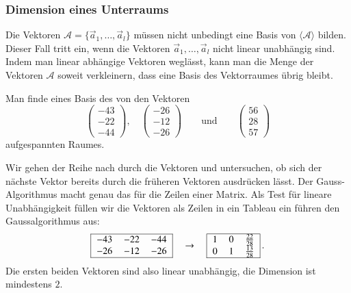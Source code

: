 \subsubsection{Dimension eines Unterraums}
Die Vektoren $\mathcal{A}=\{\vec{a}_1,\dots,\vec{a}_l\}$ müssen nicht
unbedingt eine Basis von $\langle\mathcal{A}\rangle$ bilden.
Dieser Fall tritt ein, wenn die Vektoren $\vec{a}_1,\dots,\vec{a}_l$
nicht linear unabhängig sind.
Indem man linear abhängige Vektoren weglässt, kann man die Menge der
Vektoren $\mathcal{A}$ soweit verkleinern, dass eine Basis des 
Vektorraumes übrig bleibt.

\begin{beispiel}
Man finde eines Basis des von den Vektoren 
\[
\begin{pmatrix}
  -43\\  -22\\  -44
\end{pmatrix},\quad
\begin{pmatrix}
  -26\\  -12\\  -26
\end{pmatrix}
\qquad\text{und}\qquad
\begin{pmatrix}
   56\\   28\\   57
\end{pmatrix}
\]
aufgespannten Raumes.

\smallskip

{\parindent=0pt Wir} gehen der Reihe nach durch die Vektoren und untersuchen,
ob sich der nächste Vektor bereits durch die früheren Vektoren 
ausdrücken lässt.
Der Gauss-Algorithmus macht genau das für die Zeilen einer Matrix.
Als Test für lineare Unabhängigkeit
füllen wir die Vektoren als Zeilen in ein Tableau ein führen
den Gaussalgorithmus aus:
\[
\begin{tabular}{|>{$}c<{$}>{$}c<{$}>{$}c<{$}|}
\hline
  -43&  -22&  -44\\
  -26&  -12&  -26\\
\hline
\end{tabular}
\quad\rightarrow\quad
\begin{tabular}{|>{$}c<{$}>{$}c<{$}>{$}c<{$}|}
\hline
1&0&\frac{22}{28}\\
0&1&\frac{13}{28}\\
\hline
\end{tabular}\,.
\]
Die ersten beiden Vektoren sind also linear unabhängig, die Dimension
ist mindestens $2$.


\end{beispiel}

